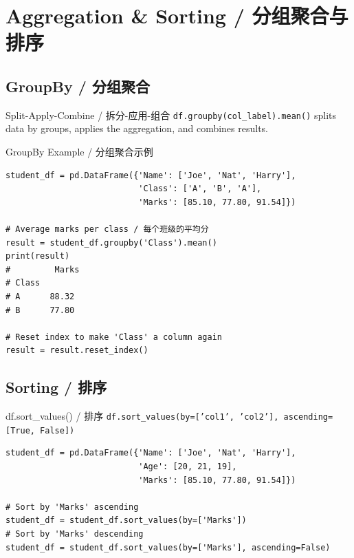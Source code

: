 \documentclass[11pt,a4paper]{report}
\let\oldtexttt\texttt
\renewcommand{\texttt}[1]{\textcolor{mainblue}{\oldtexttt{#1}}}
\begin{document}
\section{Aggregation \& Sorting / 分组聚合与排序}

\subsection{GroupBy / 分组聚合}

\begin{concept}{Split-Apply-Combine / 拆分-应用-组合}
    \texttt{df.groupby(col\_label).mean()} splits data by groups, applies the aggregation, and combines results.
\end{concept}

\begin{examplebox}{GroupBy Example / 分组聚合示例}
\begin{lstlisting}
student_df = pd.DataFrame({'Name': ['Joe', 'Nat', 'Harry'],
                           'Class': ['A', 'B', 'A'],
                           'Marks': [85.10, 77.80, 91.54]})

# Average marks per class / 每个班级的平均分
result = student_df.groupby('Class').mean()
print(result)
#         Marks
# Class
# A      88.32
# B      77.80

# Reset index to make 'Class' a column again
result = result.reset_index()
\end{lstlisting}
\end{examplebox}

\subsection{Sorting / 排序}

\begin{examplebox}{df.sort\_values() / 排序}
    \texttt{df.sort\_values(by=['col1', 'col2'], ascending=[True, False])}
\begin{lstlisting}
student_df = pd.DataFrame({'Name': ['Joe', 'Nat', 'Harry'],
                           'Age': [20, 21, 19],
                           'Marks': [85.10, 77.80, 91.54]})

# Sort by 'Marks' ascending
student_df = student_df.sort_values(by=['Marks'])
# Sort by 'Marks' descending
student_df = student_df.sort_values(by=['Marks'], ascending=False)
\end{lstlisting}
\end{examplebox}
\end{document}

